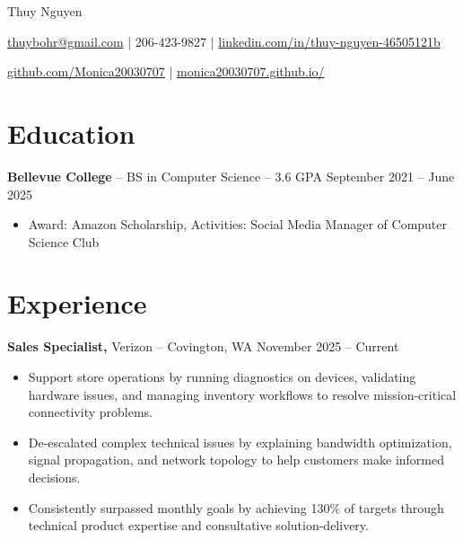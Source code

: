 \documentclass[11pt]{article}       %
\begin{document}
\centerline{\Huge Thuy Nguyen}

\vspace{5pt}

\centerline{\href{mailto:thuybohr@gmail.com}{thuybohr@gmail.com} | 206-423-9827 |
\href{https://www.linkedin.com/in/thuy-nguyen-46505121b/}{linkedin.com/in/thuy-nguyen-46505121b}}

\centerline{\href{https://github.com/Monica20030707}{github.com/Monica20030707} | 
\href{https://monica20030707.github.io/}{monica20030707.github.io/}} 

\vspace{-9pt}

\section*{Education}
\textbf{Bellevue College} -- BS in Computer Science -- 3.6 GPA \hfill September 2021 -- June 2025\\
\vspace{-9pt}
\begin{itemize}
  \item Award: Amazon Scholarship, Activities: Social Media Manager of Computer Science Club
\end{itemize}

\vspace{-18.5pt}

\section*{Experience}

\textbf{Sales Specialist,} {Verizon} -- Covington, WA \hfill November 2025 -- Current \\
\vspace{-9pt}
\begin{itemize}
  \item Support store operations by running diagnostics on devices, validating hardware issues, and managing inventory workflows to resolve mission-critical connectivity problems.
  \item De-escalated complex technical issues by explaining bandwidth optimization, signal propagation, and network topology to help customers make informed decisions.
  \item Consistently surpassed monthly goals by achieving 130\% of targets through technical product expertise and consultative solution-delivery.
\end{itemize}
\end{document}
